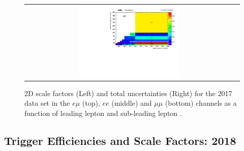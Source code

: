 \begin{figure}[h]
\begin{center}
\begin{tabular}{cc}
      \includegraphics[width=0.50\textwidth]{fig_2017_TrigSF/h2D_lepABpt_mumu_BinErrors.pdf}\\
    \end{tabular}
    \caption{2D scale factors (Left) and total uncertainties (Right) for the 2017 data set in the $e\mu$ (top), $ee$ (middle) and $\mu\mu$ (bottom) channels as a function of leading lepton \pT and sub-leading lepton \pT.}
    \label{TrigSF_2017_4}
  \end{center}
\end{figure}

\clearpage
\subsection{Trigger Efficiencies and Scale Factors: 2018}
\label{TrigSFResults2018}


